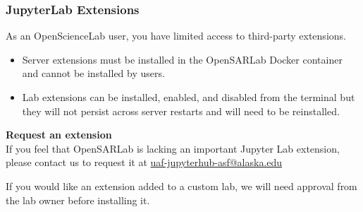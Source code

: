 \subsubsection{JupyterLab Extensions}

\newline
As an OpenScienceLab user, you have limited access to third-party extensions.

\begin{itemize}
\item Server extensions must be installed in the OpenSARLab Docker container and cannot be installed by users.
\item Lab extensions can be installed, enabled, and disabled from the terminal but they will not persist across server restarts and will need to be reinstalled.
\end{itemize}

\begin{framed}
\textbf{Request an extension}\\
If you feel that OpenSARLab is lacking an important Jupyter Lab extension, please contact us to request it at \href{mailto:uaf-jupyterhub-asf@alaska.edu}{uaf-jupyterhub-asf@alaska.edu}

If you would like an extension added to a custom lab, we will need approval from the lab owner before installing it.
\end{framed}